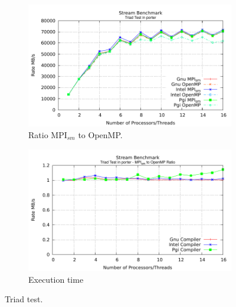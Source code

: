 \begin{figure} [h!]
    \centering
    \captionsetup{justification=centering, singlelinecheck=false}
    \begin{subfigure}{.6\textwidth}
      \hspace*{-1.5cm} 
      \includegraphics[width=0.95\linewidth]{Plots/streamBenchmark/porter-Triad.pdf}
      \caption[]{Ratio MPI$_{sm}$ to OpenMP.}
      \label{fig:Triad}
    \end{subfigure}%
    \begin{subfigure}{.6\textwidth}
      \hspace*{-1.5cm} 
      \includegraphics[width=0.95\linewidth]{Plots/streamBenchmark/porter-TriadRatio.pdf}
      \caption{Execution time}
      \label{fig:TriadRatio}
    \end{subfigure}
\caption{Triad test.}
\label{fig:TriadTestt}
\end{figure}






